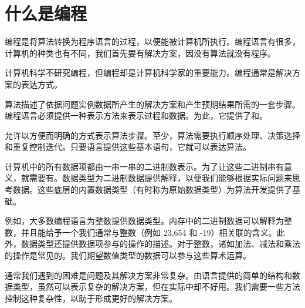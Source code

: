 \section{什么是编程}

\begin{frame}\ft{\secname}
编程是将算法转换为程序语言的过程，以便能被计算机所执行。编程语言有很多，计算机的种类也有不同，我们首先要有解决方案，因没有算法就没有程序。

计算机科学不研究编程，但编程却是计算机科学家的重要能力。编程通常是解决方案的表达方式。
\end{frame}

\begin{frame}\ft{\secname}
算法描述了依据问题实例数据所产生的解决方案和产生预期结果所需的一套步骤。编程语言必须提供一种表示方法来表示过程和数据。为此，它提供了和。
\end{frame}

\begin{frame}\ft{\secname}
允许以方便而明确的方式表示算法步骤。至少，算法需要执行顺序处理、决策选择和重复控制迭代。只要语言提供这些基本语句，它就可以表达算法。
\end{frame}

\begin{frame}\ft{\secname}
计算机中的所有数据项都由一串一串的二进制数表示。为了让这些二进制串有意义，就需要有。数据类型为二进制数据提供解释，以便我们能够根据实际问题来思考数据。这些底层的内置数据类型（有时称为原始数据类型）为算法开发提供了基础。
\end{frame}

\begin{frame}\ft{\secname}
例如，大多数编程语言为整数提供数据类型。内存中的二进制数据可以解释为整数，并且能给予一个我们通常与整数（例如 23,654 和 -19）相关联的含义。此外，数据类型还提供数据项参与的操作的描述。对于整数，诸如加法、减法和乘法的操作是常见的。我们期望数值类型的数据可以参与这些算术运算。
\end{frame}

\begin{frame}\ft{\secname}
通常我们遇到的困难是问题及其解决方案非常复杂。由语言提供的简单的结构和数据类型，虽然可以表示复杂的解决方案，但在实际中却不好用。我们需要一些方法控制这种复杂性，以助于形成更好的解决方案。
\end{frame}